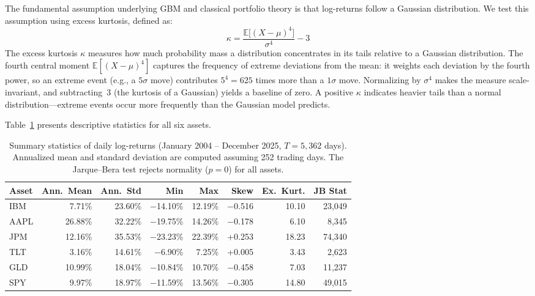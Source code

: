 \documentclass[11pt,a4paper]{article}
\newcommand{\E}{\mathbb{E}}
\begin{document}
The fundamental assumption underlying GBM and classical portfolio theory is that log-returns follow a Gaussian distribution.
We test this assumption using excess kurtosis, defined as:
\begin{equation}
\label{eq:kurtosis}
\kappa = \frac{\E\bigl[(X - \mu)^4\bigr]}{\sigma^4} - 3
\end{equation}
The excess kurtosis $\kappa$ measures how much probability mass a distribution concentrates in its tails relative to a Gaussian distribution.
The fourth central moment $\E[(X-\mu)^4]$ captures the frequency of extreme deviations from the mean: it weights each deviation by the fourth power, so an extreme event (e.g., a $5\sigma$ move) contributes $5^4 = 625$ times more than a $1\sigma$ move.
Normalizing by $\sigma^4$ makes the measure scale-invariant, and subtracting~3 (the kurtosis of a Gaussian) yields a baseline of zero.
A positive $\kappa$ indicates heavier tails than a normal distribution---extreme events occur more frequently than the Gaussian model predicts.

Table~\ref{tab:summary} presents descriptive statistics for all six assets.

\begin{table}[H]
\centering
\caption{Summary statistics of daily log-returns (January 2004 -- December 2025, $T = 5{,}362$ days). Annualized mean and standard deviation are computed assuming 252 trading days. The Jarque--Bera test rejects normality ($p = 0$) for all assets.}
\label{tab:summary}
\small
\begin{tabular}{@{}lrrrrrrr@{}}
\toprule
\textbf{Asset} & \textbf{Ann.\ Mean} & \textbf{Ann.\ Std} & \textbf{Min} & \textbf{Max} & \textbf{Skew} & \textbf{Ex.\ Kurt.} & \textbf{JB Stat} \\
\midrule
IBM  & 7.71\%  & 23.60\% & $-$14.10\% & 12.19\% & $-$0.516 & 10.10  & 23{,}049 \\
AAPL & 26.88\% & 32.22\% & $-$19.75\% & 14.26\% & $-$0.178 & 6.10   & 8{,}345  \\
JPM  & 12.16\% & 35.53\% & $-$23.23\% & 22.39\% & +0.253   & 18.23  & 74{,}340 \\
TLT  & 3.16\%  & 14.61\% & $-$6.90\%  & 7.25\%  & +0.005   & 3.43   & 2{,}623  \\
GLD  & 10.99\% & 18.04\% & $-$10.84\% & 10.70\% & $-$0.458 & 7.03   & 11{,}237 \\
SPY  & 9.97\%  & 18.97\% & $-$11.59\% & 13.56\% & $-$0.305 & 14.80  & 49{,}015 \\
\bottomrule
\end{tabular}
\end{table}
\end{document}
